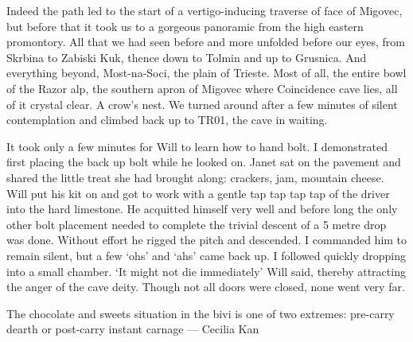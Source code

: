 Indeed the path led to the start of a vertigo-inducing traverse of face of Migovec, but before that it took us to a gorgeous panoramic from the high eastern promontory. All that we had seen before and more unfolded before our eyes, from Skrbina to Zabiski Kuk, thence down to Tolmin and up to Grusnica. And everything beyond, Most-na-Soci, the plain of Trieste. Most of all, the entire bowl of the Razor alp, the southern apron of Migovec where Coincidence cave lies, all of it crystal clear. A crow’s nest. We turned around after a few minutes of silent contemplation and climbed back up to TR01, the cave in waiting. 

It took only a few minutes for Will to learn how to hand bolt. I demonstrated first placing the back up bolt while he looked on. Janet sat on the pavement and shared the little treat she had brought along: crackers, jam, mountain cheese. Will put his kit on and got to work with a gentle tap tap tap tap  of the driver into the hard limestone. He acquitted himself very well and before long the only other bolt placement needed to complete the trivial descent of a 5 metre drop was done. Without effort he rigged the pitch and descended. I commanded him to remain silent, but a few ‘ohs’ and ‘ahs’ came back up. I followed quickly dropping into a small chamber.
‘It might not die immediately’ Will said, thereby attracting the anger of the cave deity. Though not all doors were closed, none went very far. 

\begin{marginfigure}
\centering
{}
\label{chocolate}
\caption{The chocolate and sweets situation in the bivi is one of two extremes: pre-carry dearth or post-carry instant carnage --- Cecilia Kan}
\end{marginfigure}


